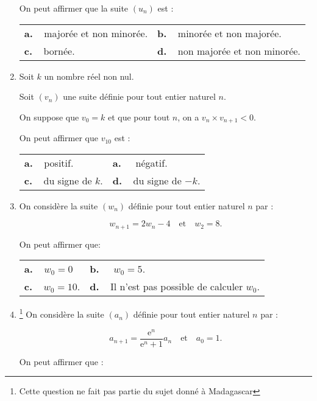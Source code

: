 \documentclass[10pt,a4paper]{article}
\begin{document}
\begin{enumerate}
On peut affirmer que la suite $\left(u_n\right)$ est :

\begin{center}
\begin{tabularx}{\linewidth}{*{2}{X}}
\textbf{a.~~}majorée et non minorée.&\textbf{b.~~}minorée et non majorée.\\
\textbf{c.~~}bornée.				&\textbf{d.~~}non majorée et non minorée.\index{suite bornée}
\end{tabularx}
\end{center}

\item Soit $k$ un nombre réel non nul.

Soit $\left(v_n\right)$  une suite définie pour tout entier naturel $n$.

On suppose que $v_0 = k$ et que pour tout $n$, on a $v_n \times v_{n+1} < 0$.

On peut affirmer que $v_{10}$ est :

\begin{center}
\begin{tabularx}{\linewidth}{*{2}{X}}
\textbf{a.~~}positif. &\textbf{a.~~} négatif.\\
\textbf{c.~~}du signe de $k$.&\textbf{d.~~}du signe de $- k$.
\end{tabularx}
\end{center}
\item On considère la suite $\left(w_n\right)$ définie pour tout entier naturel $n$ par : 

\[w_{n+1} = 2w_n - 4\quad \text{et}\quad  w_2 = 8.\]

On peut affirmer que:

\begin{center}
\begin{tabularx}{\linewidth}{*{2}{X}}
\textbf{a.~~}$w_0 = 0$&\textbf{b.~~} $w_0 = 5$.\\
\textbf{c.~~}$w_0 = 10$.&\textbf{d.~~}Il n'est pas possible de calculer $w_0$.
\end{tabularx}
\end{center}

\item \footnote{Cette question ne fait pas partie du sujet donné à Madagascar} On considère la suite $\left(a_n\right)$ définie pour tout entier naturel $n$ par :

\[a_{n+1} = \dfrac{\text{e}^n}{\text{e}^n + 1}a_n\quad \text{et} \quad a_0 = 1.\]

On peut affirmer que :


\end{enumerate}
\end{document}
